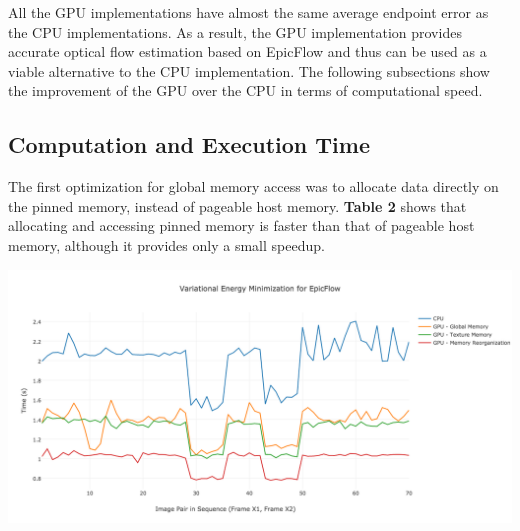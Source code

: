 \documentclass[english]{article}
\begin{document}
	\begin{center}
	\end{center}

	All the GPU implementations have almost the same average endpoint error as the CPU implementations. As a result, the GPU implementation provides accurate optical flow estimation based on EpicFlow and thus can be used as a viable alternative to the CPU implementation. The following subsections show the improvement of the GPU over the CPU in terms of computational speed.	

	\subsection{Computation and Execution Time}
	The first optimization for global memory access was to allocate data directly on the pinned memory, instead of pageable host memory. \textbf{Table 2} shows that allocating and accessing pinned memory is faster than that of pageable host memory, although it provides only a small speedup.

	\begin{center}
	\end{center}

	\begin{center}
	\includegraphics[width=170mm]{results/images/4_gpu_cpu_time_comparison.png}
	\end{center}
\end{document}
